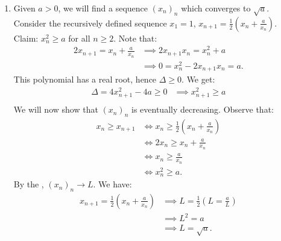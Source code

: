 \begin{example}
\begin{enumerate}[label = (\arabic*)]
            \item Given $a > 0$, we will find a sequence $(x_n)_n$ which converges to $\sqrt{a}$. Consider the recursively defined sequence $x_1 = 1$, $x_{n+1} = \frac{1}{2}\left(x_n + \frac{a}{x_n}\right)$. Claim: $x_n^2 \geq a$ for all $n \geq 2$. Note that:
                \begin{equation*}
                \begin{split}
                    2x_{n+1} = x_n + \frac{a}{x_n}
                    & \implies 2x_{n+1}x_n = x_n^2 + a \\
                    & \implies 0 = x_n^2 - 2x_{n+1}x_n = a.
                \end{split}
                \end{equation*}
            This polynomial has a real root, hence $\Delta \geq 0$. We get:
                \begin{equation*}
                \begin{split}
                    \Delta = 4x_{n+1}^2 -4a \geq 0 
                    &\implies x_{n+1} ^2\geq a \\
                \end{split}
                \end{equation*}
            We will now show that $(x_n)_n$ is eventually decreasing. Observe that:
                \begin{equation*}
                \begin{split}
                    x_n \geq x_{n+1}
                    & \iff x_n \geq \frac{1}{2}\left(x_n + \frac{a}{x_n}\right) \\
                    & \iff 2x_n \geq x_n + \frac{a}{x_n} \\
                    & \iff x_n \geq \frac{a}{x_n} \\
                    & \iff x_n^2 \geq a.
                \end{split}
                \end{equation*}
            By the , $(x_n)_n \rightarrow L$. We have:
                \begin{equation*}
                \begin{split}
                    x_{n+1} = \frac{1}{2}\left(x_n + \frac{a}{x_n}\right)
                    & \implies L = \frac{1}{2}\left(L = \frac{a}{L}\right) \\
                    & \implies L^2 = a \\
                    & \implies L = \sqrt{a}.
                \end{split}
                \end{equation*}
        \end{enumerate}        
    \end{example}


